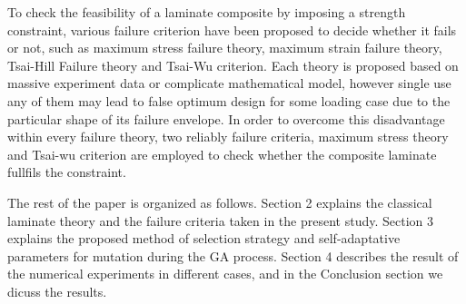 To check the feasibility of a laminate composite by imposing a strength
constraint, various failure criterion have been proposed to decide whether it
fails or not, such as  maximum stress failure theory, maximum strain failure
theory, Tsai-Hill Failure theory and Tsai-Wu criterion. Each theory is proposed
based on massive experiment data or complicate mathematical model, however
single use any of them may lead to false optimum design for some loading case
due to the particular shape of its failure envelope. In order to overcome this
disadvantage within every failure theory, two reliably failure criteria, maximum
stress theory and Tsai-wu criterion are employed to check whether the composite
laminate fullfils the constraint.



The rest of the paper is organized as follows. Section 2 explains the classical laminate theory and
the failure criteria taken in the present study.  Section 3 explains the proposed method of
selection strategy and self-adaptative parameters for mutation during the GA process. Section 4
describes the result of the numerical experiments in different cases, and in the Conclusion section
we dicuss the results.






